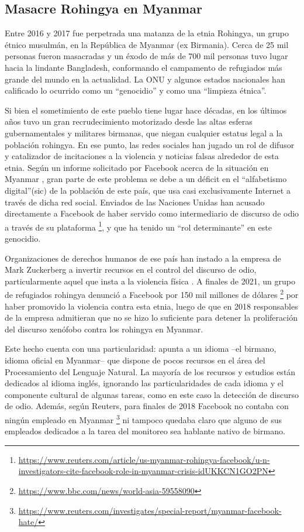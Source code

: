 \subsection{Masacre Rohingya en Myanmar}
%
Entre 2016 y 2017 fue perpetrada una matanza de la etnia Rohingya, un grupo étnico musulmán, en la República de Myanmar (ex Birmania). Cerca de 25 mil personas fueron masacradas y un éxodo de más de 700 mil personas tuvo lugar hacia la lindante Bangladesh, conformando el campamento de refugiados más grande del mundo en la actualidad. La ONU y algunos estados nacionales han calificado lo ocurrido como un ``genocidio'' y como una ``limpieza étnica''.


Si bien el sometimiento de este pueblo tiene lugar hace décadas, en los últimos años tuvo un gran recrudecimiento motorizado desde las altas esferas gubernamentales y militares birmanas, que niegan cualquier estatus legal a la población rohingya. En ese punto, las redes sociales han jugado un rol de difusor y catalizador de incitaciones a la violencia y noticias falsas alrededor de esta etnia. Según un informe solicitado por Facebook acerca de la situación en Myanmar \cite{warofka2018independent}, gran parte de este problema se debe a un déficit en el ``alfabetismo digital''(sic) de la población de este país, que usa casi exclusivamente Internet a través de dicha red social. Enviados de las Naciones Unidas han acusado directamente a Facebook de haber servido como intermediario de discurso de odio a través de su plataforma \footnote{\url{https://www.reuters.com/article/us-myanmar-rohingya-facebook/u-n-investigators-cite-facebook-role-in-myanmar-crisis-idUKKCN1GO2PN}}, y que ha tenido un ``rol determinante'' en este genocidio.

Organizaciones de derechos humanos de ese país han instado a la empresa de Mark Zuckerberg a invertir recursos en el control del discurso de odio, particularmente aquel que insta a la violencia física \cite{irrawaddy2018zuckerberg}. A finales de 2021, un grupo de refugiados rohingya denunció a Facebook por 150 mil millones de dólares \footnote{\url{https://www.bbc.com/news/world-asia-59558090}} por haber promovido la violencia contra esta etnia, luego de que en 2018 responsables de la empresa admitieran que no se hizo lo suficiente para detener la proliferación del discurso xenófobo contra los rohingya en Myanmar.

Este hecho cuenta con una particularidad: apunta a un idioma --el birmano, idioma oficial en Myanmar-- que dispone de pocos recursos en el área del Procesamiento del Lenguaje Natural. La mayoría de los recursos y estudios están dedicados al idioma inglés, ignorando las particularidades de cada idioma y el componente cultural de algunas tareas, como en este caso la detección de discurso de odio. Además, según Reuters, para finales de 2018 Facebook no contaba con ningún empleado en Myanmar \footnote{\url{https://www.reuters.com/investigates/special-report/myanmar-facebook-hate/}} ni tampoco quedaba claro que alguno de sus empleados dedicados a la tarea del monitoreo sea hablante nativo de birmano.


